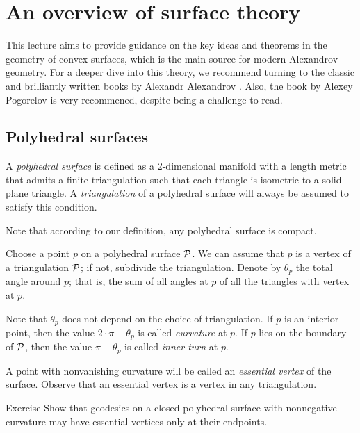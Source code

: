 \chapter{An overview of surface theory}\label{chap:surfaces}

This lecture aims to provide guidance on the key ideas and theorems in the geometry of convex surfaces, which is the main source for modern Alexandrov geometry.
For a deeper dive into this theory, we recommend turning to the classic and brilliantly written books by Alexandr Alexandrov \cite{alexandrov,alexandrov-1948}.
Also, the book by Alexey Pogorelov \cite{pogorelov1969} is very recommened, despite being a challenge to read.

\section{Polyhedral surfaces}

A \emph{polyhedral surface} is defined as a 2-dimensional manifold with a length metric that admits a finite triangulation such that each triangle is isometric to a solid plane triangle.
A \emph{triangulation} of a polyhedral surface will always be assumed to satisfy this condition.

Note that according to our definition, any polyhedral surface is compact.

Choose a point $p$ on a polyhedral surface $\mathcal{P}$.
We can assume that $p$ is a vertex of a triangulation $\mathcal{P}$;
if not, subdivide the triangulation.
Denote by $\theta_p$ the total angle around $p$;
that is, the sum of all angles at $p$ of all the triangles with vertex at $p$.

Note that $\theta_p$ does not depend on the choice of triangulation.
If $p$ is an interior point, then the value $2\cdot\pi-\theta_p$ is called \emph{curvature} at $p$.
If $p$ lies on the boundary of $\mathcal{P}$, then the value $\pi-\theta_p$ is called \emph{inner turn} at $p$.

A point with nonvanishing curvature will be called an \emph{essential vertex} of the surface.
Observe that an essential vertex is a vertex in any triangulation.

\begin{thm}{Exercise}\label{ex:geodesic-vertex}
Show that geodesics on a closed polyhedral surface with nonnegative curvature may have essential vertices only at their endpoints.
\end{thm}

